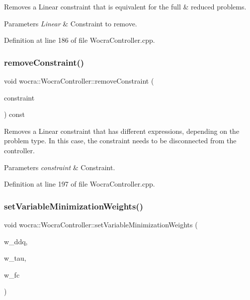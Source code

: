 Removes a Linear constraint that is equivalent for the full \& reduced problems.


\begin{DoxyParams}{Parameters}
{\em Linear} & Constraint to remove. \\
\hline
\end{DoxyParams}


Definition at line 186 of file Wocra\+Controller.\+cpp.

\hypertarget{classwocra_1_1WocraController_a9a1b55fe0392b1514a813d4f9ed413b2}{}\label{classwocra_1_1WocraController_a9a1b55fe0392b1514a813d4f9ed413b2} 
\subsubsection{\texorpdfstring{remove\+Constraint()}{removeConstraint()}\hspace{0.1cm}{\footnotesize\ttfamily [2/2]}}
{\footnotesize\ttfamily void wocra\+::\+Wocra\+Controller\+::remove\+Constraint (\begin{DoxyParamCaption}\item[{\hyperlink{classocra_1_1ControlConstraint}{ocra\+::\+Control\+Constraint} \&}]{constraint }\end{DoxyParamCaption}) const}

Removes a Linear constraint that has different expressions, depending on the problem type. In this case, the constraint needs to be disconnected from the controller.


\begin{DoxyParams}{Parameters}
{\em constraint} & Constraint. \\
\hline
\end{DoxyParams}


Definition at line 197 of file Wocra\+Controller.\+cpp.

\hypertarget{classwocra_1_1WocraController_a23b01d7dad39803132d69ae335212615}{}\label{classwocra_1_1WocraController_a23b01d7dad39803132d69ae335212615} 
\subsubsection{\texorpdfstring{set\+Variable\+Minimization\+Weights()}{setVariableMinimizationWeights()}}
{\footnotesize\ttfamily void wocra\+::\+Wocra\+Controller\+::set\+Variable\+Minimization\+Weights (\begin{DoxyParamCaption}\item[{double}]{w\+\_\+ddq,  }\item[{double}]{w\+\_\+tau,  }\item[{double}]{w\+\_\+fc }\end{DoxyParamCaption})}

